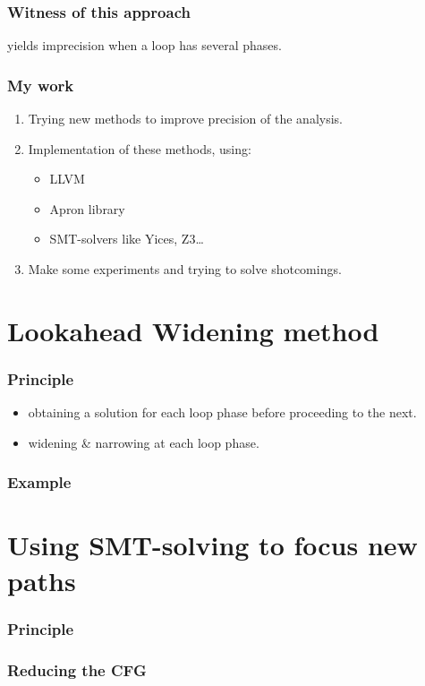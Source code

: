 \documentclass{beamer}
\begin{document}
\begin{frame}
  \frametitle{Witness of this approach}
yields imprecision when a loop has several phases.
\end{frame}

\begin{frame}
  \frametitle{My work}
\begin{enumerate}
\item Trying new methods to improve precision of the analysis.
\item Implementation of these methods, using:
\begin{itemize}
\item LLVM
\item Apron library
\item SMT-solvers like Yices, Z3\ldots
\end{itemize}
\item Make some experiments and trying to solve shotcomings.
\end{enumerate}
\end{frame}

\section[Lookahead Widening]{Lookahead Widening method}

\begin{frame}
  \frametitle{Principle}
\begin{itemize}
\item obtaining a solution for each loop phase before proceeding to the next.
\item widening \& narrowing at each loop phase.
\end{itemize}
\end{frame}

\begin{frame}
\frametitle{Example}
\end{frame}

\section[Path focusing]{Using SMT-solving to focus new paths}

\begin{frame}
  \frametitle{Principle}
\end{frame}

\begin{frame}
  \frametitle{Reducing the CFG}
\end{frame}
\end{document}
